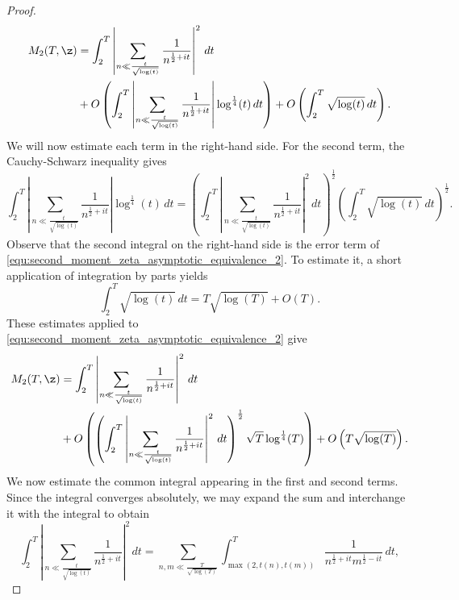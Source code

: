 \documentclass[12pt]{article}
\begin{document}
\begin{proof}
        \begin{equation}\label{equ:second_moment_zeta_asymptotic_equivalence_2}
          \begin{aligned}
            M_{2}(T,\z) &= \int_{2}^{T}\left|\sum_{n \ll \frac{t}{\sqrt{\log(t)}}}\frac{1}{n^{\frac{1}{2}+it}}\right|^{2}\,dt \\
            &+ O\left(\int_{2}^{T}\left|\sum_{n \ll \frac{t}{\sqrt{\log(t)}}}\frac{1}{n^{\frac{1}{2}+it}}\right|\log^{\frac{1}{4}}(t)\,dt\right)+O\left(\int_{2}^{T}\sqrt{\log(t)}\,dt\right).
          \end{aligned}
        \end{equation}
        We will now estimate each term in the right-hand side. For the second term, the Cauchy-Schwarz inequality gives
        \[
          \int_{2}^{T}\left|\sum_{n \ll \frac{t}{\sqrt{\log(t)}}}\frac{1}{n^{\frac{1}{2}+it}}\right|\log^{\frac{1}{4}}(t)\,dt = \left(\int_{2}^{T}\left|\sum_{n \ll \frac{t}{\sqrt{\log(t)}}}\frac{1}{n^{\frac{1}{2}+it}}\right|^{2}\,dt\right)^{\frac{1}{2}}\left(\int_{2}^{T}\sqrt{\log(t)}\,dt\right)^{\frac{1}{2}}.
        \]
        Observe that the second integral on the right-hand side is the error term of \cref{equ:second_moment_zeta_asymptotic_equivalence_2}. To estimate it, a short application of integration by parts yields
        \[
          \int_{2}^{T}\sqrt{\log(t)}\,dt = T\sqrt{\log(T)}+O(T).
        \]
        These estimates applied to \cref{equ:second_moment_zeta_asymptotic_equivalence_2} give
        \begin{equation}\label{equ:second_moment_zeta_asymptotic_equivalence_3}
          \begin{aligned}
            M_{2}(T,\z) &= \int_{2}^{T}\left|\sum_{n \ll \frac{t}{\sqrt{\log(t)}}}\frac{1}{n^{\frac{1}{2}+it}}\right|^{2}\,dt \\
            &+ O\left(\left(\int_{2}^{T}\left|\sum_{n \ll \frac{t}{\sqrt{\log(t)}}}\frac{1}{n^{\frac{1}{2}+it}}\right|^{2}\,dt\right)^{\frac{1}{2}}\sqrt{T}\log^{\frac{1}{4}}(T)\right)+O\left(T\sqrt{\log(T)}\right).
          \end{aligned}
        \end{equation}
        We now estimate the common integral appearing in the first and second terms. Since the integral converges absolutely, we may expand the sum and interchange it with the integral to obtain
        \[
          \int_{2}^{T}\left|\sum_{n \ll \frac{t}{\sqrt{\log(t)}}}\frac{1}{n^{\frac{1}{2}+it}}\right|^{2}\,dt = \sum_{n,m \ll \frac{T}{\sqrt{\log(T)}}}\int_{\max(2,t(n),t(m))}^{T}\frac{1}{n^{\frac{1}{2}+it}m^{\frac{1}{2}-it}}\,dt,
\]
\end{proof}
\end{document}
